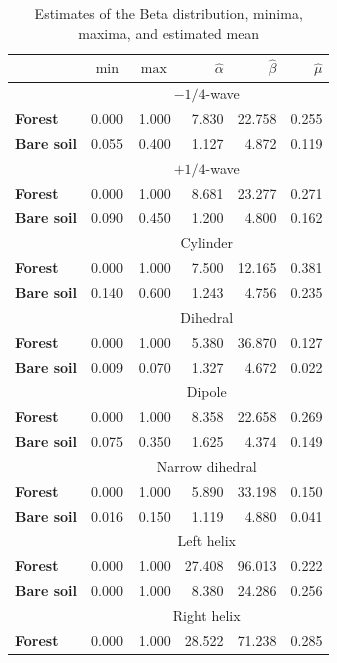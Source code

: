 \documentclass[conference]{IEEEtran}
\begin{document}
\begin{table}[hbt]
\centering
\caption{Estimates of the Beta distribution, minima, maxima, and estimated mean}\label{tab:estimated_params}     
\begin{tabular}{lrrrrr}
\toprule
& $\min$ & $\max$ & $\widehat\alpha$ & $\widehat\beta$ & $\widehat\mu$\\ \midrule
& \multicolumn{5}{c}{$-1/4$-wave}\\
\cmidrule(lr){2-6}
\textbf{Forest} & 0.000 & 1.000 & 7.830 & 22.758 & 0.255\\
\textbf{Bare soil} & 0.055 & 0.400 & 1.127 & 4.872 & 0.119\\
\midrule
%
& \multicolumn{5}{c}{$+1/4$-wave}\\
\cmidrule(lr){2-6}
\textbf{Forest} & 0.000 & 1.000 & 8.681 & 23.277 & 0.271\\
\textbf{Bare soil} & 0.090 & 0.450 & 1.200 & 4.800 & 0.162\\
\midrule
%
& \multicolumn{5}{c}{Cylinder}\\
\cmidrule(lr){2-6}
\textbf{Forest} & 0.000 & 1.000 & 7.500 & 12.165 & 0.381\\
\textbf{Bare soil} & 0.140 & 0.600 & 1.243 & 4.756 & 0.235\\
\midrule
%
& \multicolumn{5}{c}{Dihedral}\\
\cmidrule(lr){2-6}
\textbf{Forest} & 0.000 & 1.000 & 5.380 & 36.870 & 0.127\\
\textbf{Bare soil} & 0.009 & 0.070 & 1.327 & 4.672 & 0.022\\
\midrule
%
& \multicolumn{5}{c}{Dipole}\\
\textbf{Forest} & 0.000 & 1.000 & 8.358 & 22.658 & 0.269\\
\textbf{Bare soil} & 0.075 & 0.350 & 1.625 & 4.374 & 0.149\\
\midrule
%
& \multicolumn{5}{c}{Narrow dihedral}\\
\cmidrule(lr){2-6}
\textbf{Forest} & 0.000 & 1.000 & 5.890 & 33.198 & 0.150\\
\textbf{Bare soil} & 0.016 & 0.150 & 1.119 & 4.880 & 0.041\\
\midrule
%
& \multicolumn{5}{c}{Left helix}\\
\cmidrule(lr){2-6}
\textbf{Forest} & 0.000 & 1.000 & 27.408 & 96.013 & 0.222\\
\textbf{Bare soil} & 0.000 & 1.000 & 8.380 & 24.286 & 0.256\\
\midrule
& \multicolumn{5}{c}{Right helix}\\
\cmidrule(lr){2-6}
\textbf{Forest} & 0.000 & 1.000 & 28.522 & 71.238 & 0.285\\

\end{tabular}
\end{table}
\end{document}
